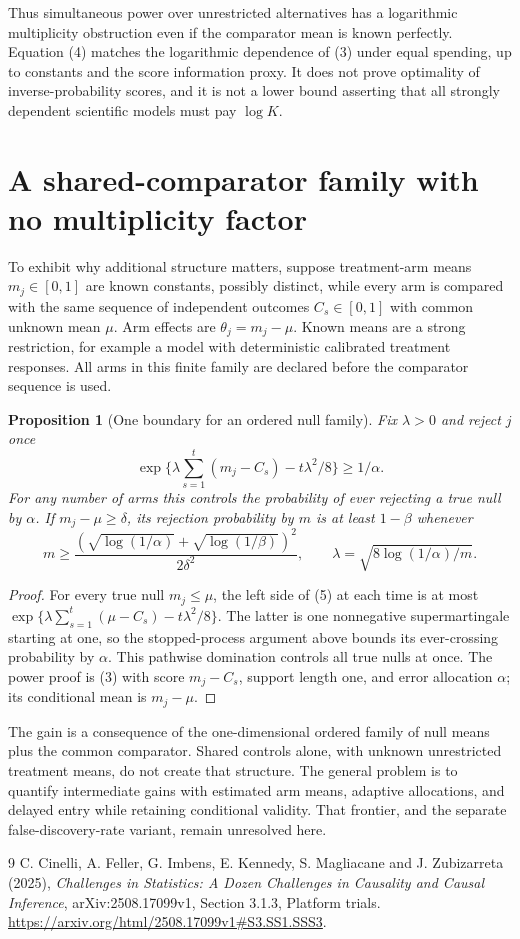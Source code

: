 \documentclass[11pt]{article}
\newtheorem{proposition}[theorem]{Proposition}
\theoremstyle{remark}
\begin{document}
Thus simultaneous power over unrestricted alternatives has a logarithmic
multiplicity obstruction even if the comparator mean is known perfectly.
Equation (4) matches the logarithmic dependence of (3) under equal spending,
up to constants and the score information proxy. It does not prove optimality
of inverse-probability scores, and it is not a lower bound asserting that
all strongly dependent scientific models must pay $\log K$.

\section{A shared-comparator family with no multiplicity factor}
To exhibit why additional structure matters, suppose treatment-arm means
$m_j\in[0,1]$ are known constants, possibly distinct, while every arm is
compared with the same sequence of independent outcomes
$C_s\in[0,1]$ with common unknown mean $\mu$. Arm effects are
$\theta_j=m_j-\mu$. Known means are a strong restriction, for example a
model with deterministic calibrated treatment responses. All arms in this
finite family are declared before the comparator sequence is used.

\begin{proposition}[One boundary for an ordered null family]
Fix $\lambda>0$ and reject $j$ once
\[
 \exp\{\lambda\textstyle\sum_{s=1}^t(m_j-C_s)-t\lambda^2/8\}
       \geq1/\alpha. \tag{5}
\]
For any number of arms this controls the probability of ever rejecting a
true null by $\alpha$. If $m_j-\mu\geq\delta$, its rejection probability
by $m$ is at least $1-\beta$ whenever
\[
 m\geq\frac{(\sqrt{\log(1/\alpha)}+
                    \sqrt{\log(1/\beta)})^2}{2\delta^2},
 \qquad\lambda=\sqrt{8\log(1/\alpha)/m}.
\]
\end{proposition}
\begin{proof}
For every true null $m_j\leq\mu$, the left side of (5) at each time is
at most $\exp\{\lambda\sum_{s=1}^t(\mu-C_s)-t\lambda^2/8\}$.
The latter is one nonnegative supermartingale starting at one, so the
stopped-process argument above bounds its ever-crossing probability by
$\alpha$. This pathwise domination controls all true nulls at once.
The power proof is (3) with score $m_j-C_s$, support length one,
and error allocation $\alpha$; its conditional mean is $m_j-\mu$.
\end{proof}

The gain is a consequence of the one-dimensional ordered family of null
means plus the common comparator. Shared controls alone, with unknown
unrestricted treatment means, do not create that structure. The general
problem is to quantify intermediate gains with estimated arm means,
adaptive allocations, and delayed entry while retaining conditional
validity. That frontier, and the separate false-discovery-rate variant,
remain unresolved here.

\begin{thebibliography}{9}
 C. Cinelli, A. Feller, G. Imbens, E. Kennedy,
S. Magliacane and J. Zubizarreta (2025), \emph{Challenges in Statistics:
A Dozen Challenges in Causality and Causal Inference}, arXiv:2508.17099v1,
Section 3.1.3, Platform trials.
\url{https://arxiv.org/html/2508.17099v1#S3.SS1.SSS3}.
\end{thebibliography}
\end{document}
